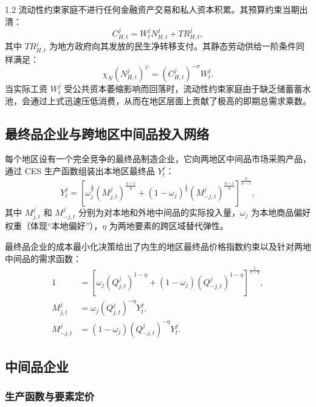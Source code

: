 \documentclass[12pt,UTF8]{ctexart}
\begin{document}
\begin{spacing}{1.2}
		流动性约束家庭不进行任何金融资产交易和私人资本积累。其预算约束当期出清：
		\begin{equation}
			C_{H,t}^j=W_t^jN_{H,t}^j+TR_{H,t}^j,
			\label{eq:budget_H}
		\end{equation}
		其中 $TR_{H,t}^j$ 为地方政府向其发放的民生净转移支付。其静态劳动供给一阶条件同样满足：
		\begin{equation}
			\chi_N(N_{H,t}^j)^{\varphi}=(C_{H,t}^j)^{-\sigma}W_t^j.
			\label{eq:labor_H}
		\end{equation}
		当实际工资 $W_t^j$ 受公共资本萎缩影响而回落时，流动性约束家庭由于缺乏储蓄蓄水池，会通过上式迅速压低消费，从而在地区层面上贡献了极高的即期总需求乘数。
		
		\subsection{最终品企业与跨地区中间品投入网络}
		
		每个地区设有一个完全竞争的最终品制造企业，它向两地区中间品市场采购产品，通过 CES 生产函数组装出本地区最终品 $Y_t^j$：
		\begin{equation}
			Y_t^j=
			\left[
			\omega_j^{\frac{1}{\eta}}(M_{j,t}^j)^{\frac{\eta-1}{\eta}}
			+(1-\omega_j)^{\frac{1}{\eta}}(M_{-j,t}^j)^{\frac{\eta-1}{\eta}}
			\right]^{\frac{\eta}{\eta-1}},
			\label{eq:final_production}
		\end{equation}
		其中 $M_{j,t}^j$ 和 $M_{-j,t}^j$ 分别为对本地和外地中间品的实际投入量，$\omega_j$ 为本地商品偏好权重（体现“本地偏好”），$\eta$ 为两地要素的跨区域替代弹性。
		
		最终品企业的成本最小化决策给出了内生的地区最终品价格指数约束以及针对两地中间品的需求函数：
		\begin{align}
			1 &=\left[
			\omega_j(Q_{j,t}^j)^{1-\eta}
			+(1-\omega_j)(Q_{-j,t}^j)^{1-\eta}
			\right]^{\frac{1}{1-\eta}}, \label{eq:final_price_index}\\
			M_{j,t}^j &=\omega_j(Q_{j,t}^j)^{-\eta}Y_t^j, \label{eq:demand_local}\\
			M_{-j,t}^j &=(1-\omega_j)(Q_{-j,t}^j)^{-\eta}Y_t^j.
			\label{eq:demand_foreign}
		\end{align}
		
		\subsection{中间品企业}
		
		\subsubsection{生产函数与要素定价}
		

\end{spacing}
\end{document}

